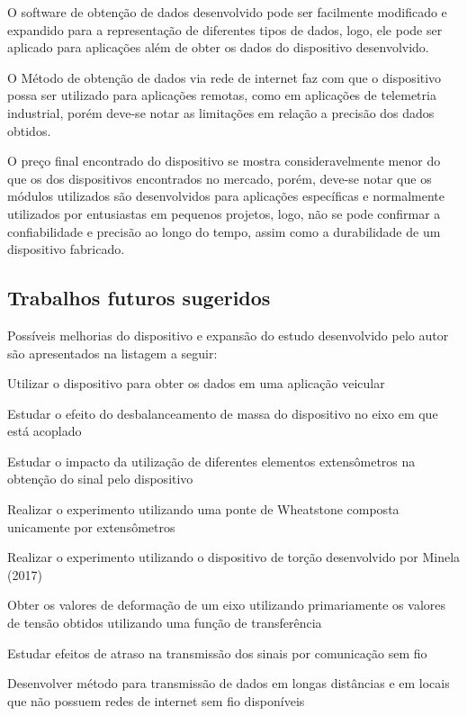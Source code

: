 O software de obtenção de dados desenvolvido pode ser facilmente modificado e expandido para a representação de diferentes tipos de dados, logo, ele pode ser aplicado para aplicações
além de obter os dados do dispositivo desenvolvido.

O Método de obtenção de dados via rede de internet faz com que o dispositivo possa ser utilizado para aplicações remotas, como em aplicações de telemetria industrial, porém
deve-se notar as limitações em relação a precisão dos dados obtidos.

O preço final encontrado do dispositivo se mostra consideravelmente menor do que os dos dispositivos encontrados no mercado, porém, deve-se notar que os módulos utilizados são
desenvolvidos para aplicações específicas e normalmente utilizados por entusiastas em pequenos projetos, logo, não se pode confirmar a confiabilidade e precisão ao longo do tempo,
assim como a durabilidade de um dispositivo fabricado.

\subsection{Trabalhos futuros sugeridos}

Possíveis melhorias do dispositivo e expansão do estudo desenvolvido pelo autor são apresentados na listagem a seguir:

\begin{alineas}
    \item{Utilizar o dispositivo para obter os dados em uma aplicação veicular}
    \item{Estudar o efeito do desbalanceamento de massa do dispositivo no eixo em que está acoplado}
    \item{Estudar o impacto da utilização de diferentes elementos extensômetros na obtenção do sinal pelo dispositivo}
    \item{Realizar o experimento utilizando uma ponte de Wheatstone composta unicamente por extensômetros}
    \item{Realizar o experimento utilizando o dispositivo de torção desenvolvido por Minela (2017)}
    \item{Obter os valores de deformação de um eixo utilizando primariamente os valores de tensão obtidos utilizando uma função de transferência}
    \item{Estudar efeitos de atraso na transmissão dos sinais por comunicação sem fio}
    \item{Desenvolver método para transmissão de dados em longas distâncias e em locais que não possuem redes de internet sem fio disponíveis}
\end{alineas}
